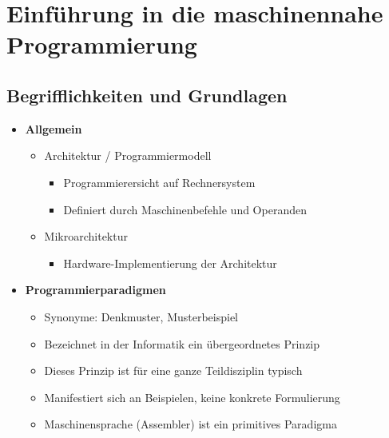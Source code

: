 \section{Einführung in die maschinennahe Programmierung}
\subsection{Begrifflichkeiten und Grundlagen}
    \begin{itemize}
        \item \textbf{Allgemein}
            \begin{itemize}
                \item Architektur / Programmiermodell
                    \begin{itemize}
                        \item Programmierersicht auf Rechnersystem 
                        \item Definiert durch Maschinenbefehle und Operanden
                    \end{itemize}
                \item Mikroarchitektur
                    \begin{itemize}
                        \item Hardware-Implementierung der Architektur
                    \end{itemize}
            \end{itemize}
        
        \item \textbf{Programmierparadigmen}
            \begin{itemize}
                \item Synonyme: Denkmuster, Musterbeispiel
                \item Bezeichnet in der Informatik ein übergeordnetes Prinzip
                \item Dieses Prinzip ist für eine ganze Teildisziplin typisch
                \item Manifestiert sich an Beispielen, keine konkrete Formulierung
                \item Maschinensprache (Assembler) ist ein primitives Paradigma              
            \end{itemize}


\end{itemize}
